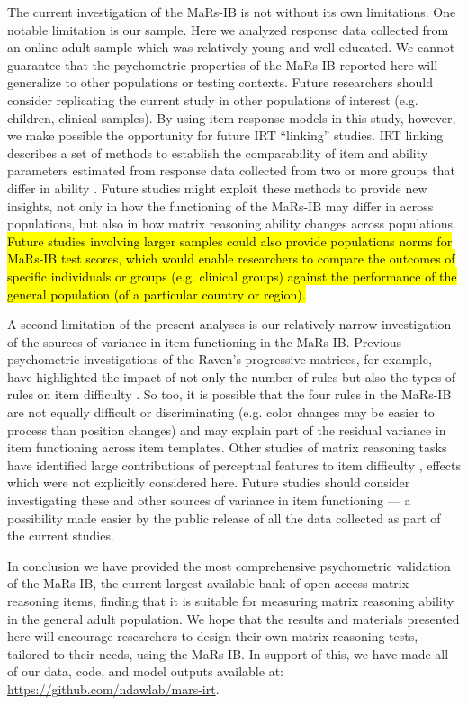 \documentclass[a4paper,man,natbib,noextraspace]{apa6}
\begin{document}
The current investigation of the MaRs-IB is not without its own limitations. One notable limitation is our sample. Here we analyzed response data collected from an online adult sample which was relatively young and well-educated. We cannot guarantee that the psychometric properties of the MaRs-IB reported here will generalize to other populations or testing contexts. Future researchers should consider replicating the current study in other populations of interest (e.g. children, clinical samples). By using item response models in this study, however, we make possible the opportunity for future IRT ``linking'' studies. IRT linking describes a set of methods to establish the comparability of item and ability parameters estimated from response data collected from two or more groups that differ in ability \citep{lee2018irt}. Future studies might exploit these methods to provide new insights, not only in how the functioning of the MaRs-IB may differ in across populations, but also in how matrix reasoning ability changes across populations. \hl{Future studies involving larger samples could also provide populations norms for MaRs-IB test scores, which would enable researchers to compare the outcomes of specific individuals or groups (e.g. clinical groups) against the performance of the general population (of a particular country or region).}

A second limitation of the present analyses is our relatively narrow investigation of the sources of variance in item functioning in the MaRs-IB. Previous psychometric investigations of the Raven's progressive matrices, for example, have highlighted the impact of not only the number of rules but also the types of rules on item difficulty \citep{carpenter1990one, embretson1998cognitive}. So too, it is possible that the four rules in the MaRs-IB are not equally difficult or discriminating (e.g. color changes may be easier to process than position changes) and may explain part of the residual variance in item functioning across item templates. Other studies of matrix reasoning tasks have identified large contributions of perceptual features to item difficulty \citep{primi2001complexity, primi2014developing}, effects which were not explicitly considered here. Future studies should consider investigating these and other sources of variance in item functioning --- a possibility made easier by the public release of all the data collected as part of the current studies.

In conclusion we have provided the most comprehensive psychometric validation of the MaRs-IB, the current largest available bank of open access matrix reasoning items, finding that it is suitable for measuring matrix reasoning ability in the general adult population. We hope that the results and materials presented here will encourage researchers to design their own matrix reasoning tests, tailored to their needs, using the MaRs-IB. In support of this, we have made all of our data, code, and model outputs available at: \url{https://github.com/ndawlab/mars-irt}.
\end{document}
